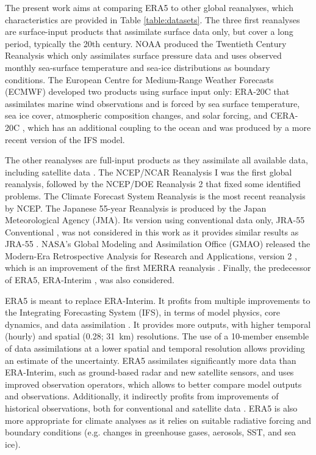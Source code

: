 \documentclass[alpha-refs]{wiley-article}
\begin{document}
The present work aims at comparing ERA5 \citep{Hersbach2019} to other global reanalyses, which characteristics are provided in Table \ref{table:datasets}. The three first reanalyses are surface-input \citep{Fujiwara2017} products that assimilate surface data only, but cover a long period, typically the 20th century. NOAA produced the Twentieth Century Reanalysis \citep[version 2c, 20CR-2c --][]{Compo2011} which only assimilates surface pressure data and uses observed monthly sea-surface temperature and sea-ice distributions as boundary conditions. The European Centre for Medium-Range Weather Forecasts (ECMWF) developed two products using surface input only: ERA-20C \citep{Poli2016} that assimilates marine wind observations and is forced by sea surface temperature, sea ice cover, atmospheric composition changes, and solar forcing, and CERA-20C \citep{Laloyaux2018a}, which has an additional coupling to the ocean and was produced by a more recent version of the IFS model.

The other reanalyses are full-input products as they assimilate all available data, including satellite data \citep{Fujiwara2017}. The NCEP/NCAR Reanalysis I \citep[NR-1 --][]{Kalnay1996, Kistler2001} was the first global reanalysis, followed by the NCEP/DOE Reanalysis 2 \citep[NR-2 --][]{Kanamitsu2002} that fixed some identified problems. The Climate Forecast System Reanalysis \citep[CFSR --][]{Saha2010a} is the most recent reanalysis by NCEP. The Japanese 55-year Reanalysis \citep[JRA-55 --][]{Kobayashi2015, Harada2016} is produced by the Japan Meteorological Agency (JMA). Its version using conventional data only, JRA-55 Conventional \citep[JRA-55C --][]{Kobayashi2014}, was not considered in this work as it provides similar results as JRA-55 \citep{Horton2018b}. NASA's Global Modeling and Assimilation Office (GMAO) released the Modern-Era Retrospective Analysis for Research and Applications, version 2 \citep[MERRA-2 -- ][]{Gelaro2017}, which is an improvement of the first MERRA reanalysis \citep{Rienecker2011}. Finally, the predecessor of ERA5, ERA-Interim \citep[ERA-INT --][]{Dee2011a}, was also considered.

ERA5 \citep{Hersbach2019} is meant to replace ERA-Interim. It profits from multiple improvements to the Integrating Forecasting System (IFS), in terms of model physics, core dynamics, and data assimilation \citep{Hersbach2019}. It provides more outputs, with higher temporal (hourly) and spatial (0.28\degree; 31~km) resolutions. The use of a 10-member ensemble of data assimilations at a lower spatial and temporal resolution allows providing an estimate of the uncertainty. ERA5 assimilates significantly more data than ERA-Interim, such as ground-based radar and new satellite sensors, and uses improved observation operators, which allows to better compare model outputs and observations. Additionally, it indirectly profits from improvements of historical observations, both for conventional and satellite data \citep{Hersbach2019}. ERA5 is also more appropriate for climate analyses as it relies on suitable radiative forcing and boundary conditions (e.g. changes in greenhouse gases, aerosols, SST, and sea ice).
\end{document}
